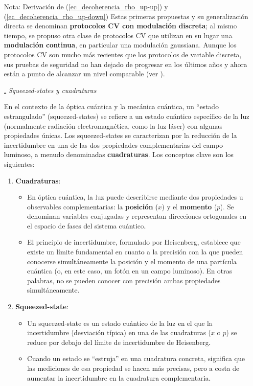 \documentclass[a4paper,11pt]{book} %
\numberwithin{equation}{chapter}
\def\subsubiContadorIt{\par\addtocounter{subsubsection}{1}\underline{\it\thesubsubsection.}\hskip0.5cm \setcounter{subsubsubsectionIt}{0}}
\newcommand{\SubsubiIt}[1]{
		\subsubiContadorIt \textit{#1}
	}
\newcounter{subsubsubsectionIt}[subsubsection]
\begin{document}
\begin{mybox_blue}{Nota: Derivación de (\ref{ec_decoherencia_rho_up-up}) y  (\ref{ec_decoherencia_rho_up-down})}
Estas primeras propuestas y su generalización directa se denominan \textbf{protocolos CV con modulación discreta}; al mismo tiempo, se propuso otra clase de protocolos CV que utilizan en su lugar una \textbf{modulación continua}, en particular una modulación gaussiana. Aunque los protocolos CV son mucho más recientes que los protocolos de variable discreta, sus pruebas de seguridad no han dejado de progresar en los últimos años y ahora están a punto de alcanzar un nivel comparable (ver \cite{QKD_resumen}).

		\SubsubiIt{Squeezed-states y cuadraturas}
		
En el contexto de la óptica cuántica y la mecánica cuántica, un ``estado estrangulado'' (squeezed-states) se refiere a un estado cuántico específico de la luz (normalmente radiación electromagnética, como la luz láser) con algunas propiedades únicas. Los squeezed-states se caracterizan por la reducción de la incertidumbre en una de las dos propiedades complementarias del campo luminoso, a menudo denominadas \textbf{cuadraturas}. Los conceptos clave son los siguientes: 
\begin{enumerate}
	\item \textbf{Cuadraturas}: 
	\begin{itemize}
		\item En óptica cuántica, la luz puede describirse mediante dos propiedades u observables complementarias: la \textbf{posición} ($x$) y el \textbf{momento} ($p$). Se denominan variables conjugadas y representan direcciones ortogonales en el espacio de fases del sistema cuántico.
		\item El principio de incertidumbre, formulado por Heisenberg, establece que existe un límite fundamental en cuanto a la precisión con la que pueden conocerse simultáneamente la posición y el momento de una partícula cuántica (o, en este caso, un fotón en un campo luminoso). En otras palabras, no se pueden conocer con precisión ambas propiedades simultáneamente.
	\end{itemize}

	\item \textbf{Squeezed-state}: 
	\begin{itemize}
		\item Un squeezed-state es un estado cuántico de la luz en el que la incertidumbre (desviación típica) en una de las cuadraturas ($x$ o $p$) se reduce por debajo del límite de incertidumbre de Heisenberg.
   		\item Cuando un estado se ``estruja'' en una cuadratura concreta, significa que las mediciones de esa propiedad se hacen más precisas, pero a costa de aumentar la incertidumbre en la cuadratura complementaria.
	\end{itemize}
	

\end{enumerate}
\end{mybox_blue}
\end{document}
